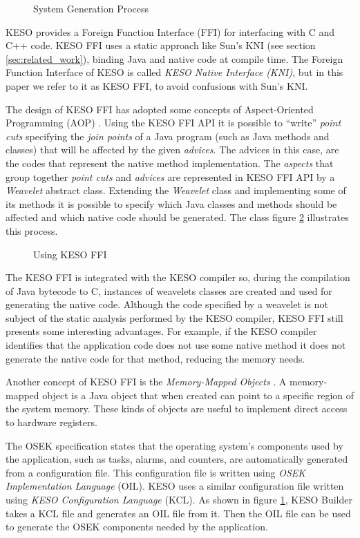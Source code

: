 \documentclass[12pt]{article} %
\newcommand{\fig}[4][htb]{
  \begin{figure}[#1] {\centering\scalebox{#2}{\texttt{[image: fig/\#3]}}\par}
    \caption{#4\label{fig:#3}}
  \end{figure}
}
\begin{document}
\fig{.5}{keso_sys_gen}{System Generation Process \cite{Wawersich:2007}}

KESO provides a Foreign Function Interface (FFI) for interfacing with C and C++ code. KESO FFI uses a static approach like Sun's KNI (see section \ref{sec:related_work}), binding Java and native code at compile time. The Foreign Function Interface of KESO is called \emph{KESO Native Interface (KNI)}, but in this paper we refer to it as KESO FFI, to avoid confusions with Sun's KNI.

The design of KESO FFI has adopted some concepts of Aspect-Oriented Programming (AOP) \cite{Kiczales97aspect-orientedprogramming}. Using the KESO FFI API it is possible to ``write'' \emph{point cuts} specifying the \emph{join points} of a Java program (such as Java methods and classes) that will be affected by the given \emph{advices}. The advices in this case, are the codes that represent the native method implementation. The \emph{aspects} that group together \emph{point cuts} and \emph{advices} are represented in KESO FFI API by a \emph{Weavelet} abstract class. Extending the \emph{Weavelet} class and implementing some of its methods it is possible to specify which Java classes and methods should be affected and which native code should be generated. The class figure \ref{fig:weavelet_extension_generic} illustrates this process.

\fig{.4}{weavelet_extension_generic}{Using KESO FFI}

The KESO FFI is integrated with the KESO compiler so, during the compilation of Java bytecode to C, instances of weavelets classes are created and used for generating the native code. Although the code specified by a weavelet is not subject of the static analysis performed by the KESO compiler, KESO FFI still presents some interesting advantages. For example, if the KESO compiler identifies that the application code does not use some native method it does not generate the native code for that method, reducing the memory needs.

Another concept of KESO FFI is the \emph{Memory-Mapped Objects} \cite{Thomm:2010:KOM:1850771.1850788}. A memory-mapped object is a Java object that when created can point to a specific region of the system memory. These kinds of objects are useful to implement direct access to hardware registers.

The OSEK specification states that the operating system's components used by 
the application, such as tasks, alarms, and counters, are automatically generated
from a configuration file. This configuration file is written using \emph{OSEK 
Implementation Language} (OIL). KESO uses a similar configuration file written
using \emph{KESO Configuration Language} (KCL). As shown in figure 
\ref{fig:keso_sys_gen}, KESO Builder takes a KCL file and generates an OIL file
from it. Then the OIL file can be used to generate the OSEK components needed 
by the application.
\end{document}
